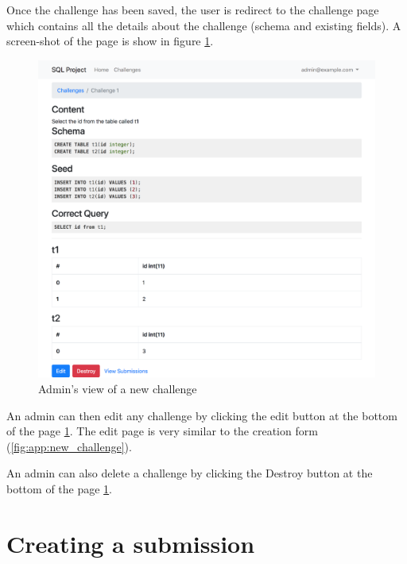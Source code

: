 Once the challenge has been saved, the user is redirect to the challenge page which contains all the details about the challenge (schema and existing fields). A screen-shot of the page is show in figure \ref{fig:app:challengeadmin}.

\begin{figure}
    \centering
    \includegraphics[width=\textwidth/4*3]{Appendices/adminchallenge.png}
    \caption{Admin's view of a new challenge}
    \label{fig:app:challengeadmin}
\end{figure}

An admin can then edit any challenge by clicking the edit button at the bottom of the page \ref{fig:app:challengeadmin}. The edit page is very similar to the creation form (\ref{fig:app:new_challenge}).

An admin can also delete a challenge by clicking the Destroy button at the bottom of the page \ref{fig:app:challengeadmin}.

\section{Creating a submission}